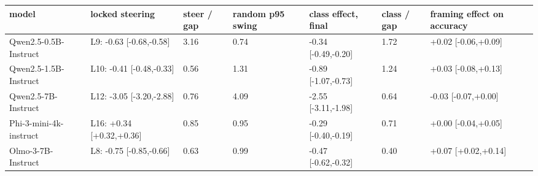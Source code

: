 \begin{tabular}{lllllll}
\toprule
model & locked steering & steer / gap & random p95 swing & class effect, final & class / gap & framing effect on accuracy \\
\midrule
Qwen2.5-0.5B-Instruct & L9: -0.63 [-0.68,-0.58] & 3.16 & 0.74 & -0.34 [-0.49,-0.20] & 1.72 & +0.02 [-0.06,+0.09] \\
Qwen2.5-1.5B-Instruct & L10: -0.41 [-0.48,-0.33] & 0.56 & 1.31 & -0.89 [-1.07,-0.73] & 1.24 & +0.03 [-0.08,+0.13] \\
Qwen2.5-7B-Instruct & L12: -3.05 [-3.20,-2.88] & 0.76 & 4.09 & -2.55 [-3.11,-1.98] & 0.64 & -0.03 [-0.07,+0.00] \\
Phi-3-mini-4k-instruct & L16: +0.34 [+0.32,+0.36] & 0.85 & 0.95 & -0.29 [-0.40,-0.19] & 0.71 & +0.00 [-0.04,+0.05] \\
Olmo-3-7B-Instruct & L8: -0.75 [-0.85,-0.66] & 0.63 & 0.99 & -0.47 [-0.62,-0.32] & 0.40 & +0.07 [+0.02,+0.14] \\
\bottomrule
\end{tabular}
